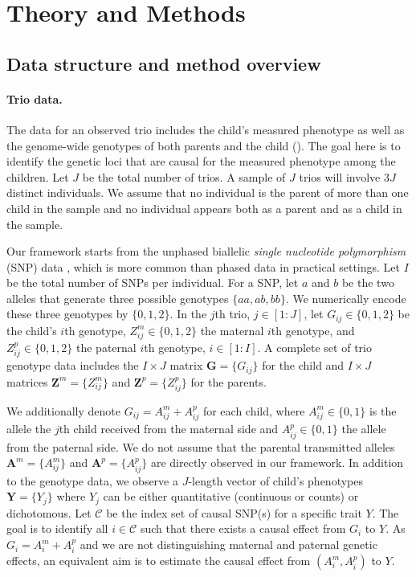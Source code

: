 \documentclass[12pt]{extarticle}
\newcommand{\nind}{J}
\newcommand{\nsnp}{I}
\newcommand{\cC}{\mathcal{C}}
\begin{document}
\section{Theory and Methods}\label{sec:tmt_concept}

\subsection{Data structure and method overview} \label{sec:tmt_basic_aims}

\paragraph{Trio data.} The data for an observed trio includes the child's measured phenotype as well as the genome-wide genotypes of both parents and the child (). The goal here is to identify the genetic loci that are causal for the measured phenotype among the children. Let $\nind$ be the total number of trios. A sample of $\nind$ trios will involve $3\nind$ distinct individuals. We assume that no individual is the parent of more than one child in the sample and no individual appears both as a parent and as a child in the sample. 

Our framework starts from the unphased biallelic \textit{single nucleotide polymorphism} (SNP) data \citep{williams1990}, which is more common than phased data in practical settings. Let $\nsnp$ be the total number of SNPs per individual. For a SNP, let $a$ and $b$ be the two alleles that generate three possible genotypes $\{aa,ab,bb\}$. We numerically encode these three genotypes by $\{0,1,2\}$. In the $j$th trio, $j\in [1:\nind]$, let $G_{ij}\in \{0,1,2\}$ be the child's $i$th genotype, $Z_{ij}^m\in \{0,1,2\}$ the maternal $i$th genotype, and $Z_{ij}^p\in \{0,1,2\}$ the paternal $i$th genotype, $i\in [1:\nsnp]$. A complete set of trio genotype data includes the $\nsnp \times \nind$ matrix $\boldsymbol{G}=\{G_{ij}\}$ for the child and $\nsnp \times \nind$ matrices $\boldsymbol{Z}^m=\{Z_{ij}^m\}$ and $\boldsymbol{Z}^p=\{Z_{ij}^p\}$ for the parents. 

We additionally denote $G_{ij}=A_{ij}^m+A_{ij}^p$ for each child, where $A_{ij}^m\in \{0,1\}$ is the allele the $j$th child received from the maternal side and $A_{ij}^p\in \{0,1\}$ the allele from the paternal side. We do not assume that the parental transmitted alleles $\boldsymbol{A}^m=\{A_{ij}^m\}$ and $\boldsymbol{A}^p=\{A_{ij}^p\}$ are directly observed in our framework. In addition to the genotype data, we observe a $\nind$-length vector of child's phenotypes $\boldsymbol{Y}=\{Y_j\}$ where $Y_j$ can be either quantitative (continuous or counts) or dichotomous. %
Let $\cC$ be the index set of causal SNP(s) for a specific trait $Y$. The goal is to identify all $i\in \cC$ such that there exists a causal effect from $G_i$ to $Y$. As $G_i=A_i^m+A_i^p$ and we are not distinguishing maternal and paternal genetic effects, an equivalent aim is to estimate the causal effect from $(A_i^m,A_i^p)$ to $Y$. 
\end{document}
